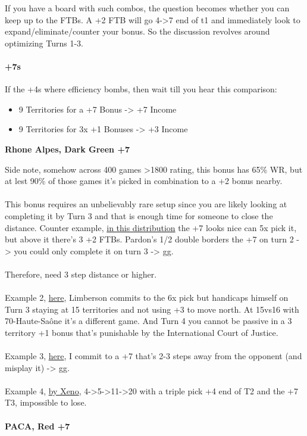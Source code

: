 If you have a board with such combos, the question becomes whether you can keep up to the FTBs. A +2 FTB will go 4->7 end of t1 and immediately look to expand/eliminate/counter your bonus. So the discussion revolves around optimizing Turns 1-3.

\paragraph{+7s}

If the +4s where efficiency bombs, then wait till you hear this comparison:
\begin{itemize}
    \item 9 Territories for a +7 Bonus -> +7 Income
    \item 9 Territories for 3x +1 Bonuses -> +3 Income
\end{itemize}

\textbf{Rhone Alpes, Dark Green +7}

Side note, somehow across 400 games >1800 rating, this bonus has 65\% WR, but at lest  90\% of those games it's picked in combination to a +2 bonus nearby.
\\
\\
This bonus requires an unbelievably rare setup since you are likely looking at completing it by Turn 3 and that is enough time for someone to close the distance. Counter example, \href{https://www.warzone.com/MultiPlayer?GameID=27915506}{in this distribution} the +7 looks nice can 5x pick it, but above it there's 3 +2 FTBs. Pardon's 1/2 double borders the +7 on turn 2 -> you could only complete it on turn 3 -> gg.
\\
\\
Therefore, need 3 step distance or higher.
\\
\\
Example 2, \href{https://www.warzone.com/MultiPlayer?GameID=15116307}{here}, Limberson commits to the 6x pick but handicaps himself on Turn 3 staying at 15 territories and not using +3 to move north. At 15vs16 with 70-Haute-Saône it's a different game. And Turn 4 you cannot be passive in a 3 territory +1 bonus that's punishable by the International Court of Justice.
\\
\\
Example 3, \href{https://www.warzone.com/MultiPlayer?GameID=40231108}{here}, I commit to a +7 that's 2-3 steps away from the opponent (and misplay it) -> gg.
\\
\\
Example 4, \href{https://www.warzone.com/MultiPlayer?GameID=38011285}{by Xeno}, 4->5->11->20 with a triple pick +4 end of T2 and the +7 T3, impossible to lose.
\\
\\
\textbf{PACA, Red +7}


